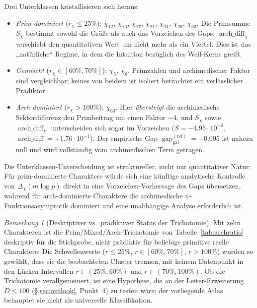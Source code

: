 \documentclass[10pt,twocolumn]{article}
\theoremstyle{definition}
\theoremstyle{remark}
\newtheorem{remark}[theorem]{Bemerkung}
\newcommand{\gap}{\operatorname{gap}}
\newcommand{\chifn}{\chi}
\newcommand{\Deltachi}{\Delta_{\chifn}}
\newcommand{\archdiff}{\operatorname{arch\_diff}}
\begin{document}
Drei Unterklassen kristallisieren sich heraus:
\begin{itemize}
  \item \emph{Prim-dominiert} ($r_{\chifn}\leq 25\%$):
    $\chifn_{12}$, $\chifn_{13}$, $\chifn_{17}$, $\chifn_{21}$,
    $\chifn_{24}$, $\chifn_{29}$, $\chifn_{33}$. Die Primsumme
    $S_{\chifn}$ bestimmt sowohl die Größe als auch das Vorzeichen des Gaps;
    $\archdiff_{\chifn}$ verschiebt den quantitativen Wert um nicht mehr
    als ein Viertel. Dies ist das „natürliche“ Regime, in dem die
    Intuition bezüglich des Weil-Kerns greift.
  \item \emph{Gemischt} ($r_{\chifn}\in[60\%,70\%]$):
    $\chifn_5$, $\chifn_8$. Primzahlen und archimedischer Faktor sind
    vergleichbar; keines von beidem ist isoliert betrachtet ein verlässlicher Prädiktor.
  \item \emph{Arch-dominiert} ($r_{\chifn}>100\%$):
    $\chifn_{60}$. Hier \emph{übersteigt} die archimedische Sektordifferenz
    den Primbeitrag um einen Faktor $\sim 4$, und
    $S_{\chifn}$ sowie $\archdiff_{\chifn}$ unterscheiden sich sogar im Vorzeichen
    ($S=-4.95\!\cdot\!10^{-2}$, $\archdiff=+1.76\!\cdot\!10^{-1}$).
    Der empirische Gap $\gap_{\mathrm{gal}}^{(\mathrm{ref})}=+0.005$ ist nahezu null und
    wird vollständig vom archimedischen Term getragen.
\end{itemize}

Die Unterklassen-Unterscheidung ist struktureller, nicht nur quantitativer Natur: Für
prim-dominierte Charaktere würde sich eine künftige analytische Kontrolle von
$\Deltachi(m\log p)$ direkt in eine Vorzeichen-Vorhersage des Gaps übersetzen,
wohrend für arch-dominierte Charaktere die archimedische
$\psi$-Funktionsasymptotik dominiert und eine unabhängige Analyse erforderlich ist.

\begin{remark}[Deskriptiver vs.\ prädiktiver Status der Trichotomie]
\label{rem:trichotomy-descriptive}
Mit zehn Charakteren ist die Prim/Mixed/Arch-Trichotomie von
Tabelle~\ref{tab:archratio} deskriptiv für die Stichprobe, nicht
prädiktiv für beliebige primitive reelle Charaktere: Die Schwellenwerte
($r\leq 25\%$, $r\in[60\%,70\%]$, $r>100\%$) wurden so gewählt, dass
sie die beobachteten Cluster trennen, mit keinem Datenpunkt in den
Lücken-Intervallen $r\in(25\%,60\%)$ und $r\in(70\%,100\%)$. Ob die
Trichotomie verallgemeinert, ist eine Hypothese, die an der
Leiter-Erweiterung $D\leq 100$ (\S\ref{sec:outlook}, Punkt~4) zu testen
wäre; der vorliegende Atlas behauptet sie nicht als universelle
Klassifikation.
\end{remark}
\end{document}
